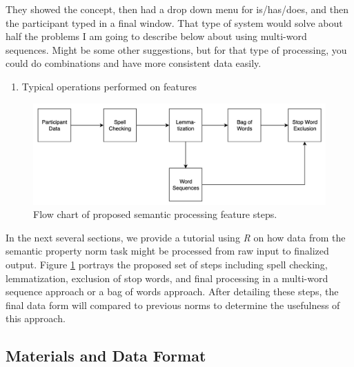 \documentclass[man]{apa6}
\providecommand{\tightlist}{%
  \setlength{\itemsep}{0pt}\setlength{\parskip}{0pt}}
\begin{document}
They showed the concept, then had a drop down menu for is/has/does, and then the participant typed in a final window. That type of system would solve about half the problems I am going to describe below about using multi-word sequences. Might be some other suggestions, but for that type of processing, you could do combinations and have more consistent data easily.

\begin{enumerate}
\def\labelenumi{\arabic{enumi}.}
\setcounter{enumi}{2}
\tightlist
\item
  Typical operations performed on features
\end{enumerate}

\begin{figure}
\includegraphics[width=5.28in]{flow_chart} \caption{Flow chart of proposed semantic processing feature steps.}\label{fig:flowchart}
\end{figure}

In the next several sections, we provide a tutorial using \emph{R} on how data from the semantic property norm task might be processed from raw input to finalized output. Figure \ref{fig:flowchart} portrays the proposed set of steps including spell checking, lemmatization, exclusion of stop words, and final processing in a multi-word sequence approach or a bag of words approach. After detailing these steps, the final data form will compared to previous norms to determine the usefulness of this approach.

\hypertarget{materials-and-data-format}{%
\subsection{Materials and Data Format}\label{materials-and-data-format}}
\end{document}
